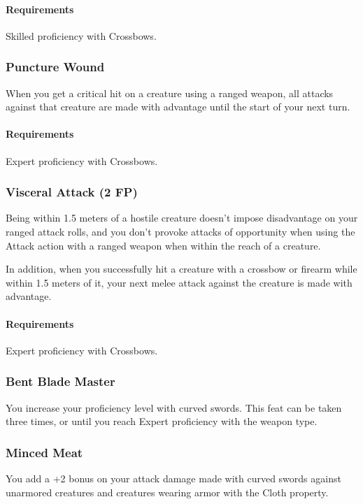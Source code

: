     \paragraph{Requirements} Skilled proficiency with Crossbows.
\subsubsection{Puncture Wound} \label{feat::puncturewound}
    When you get a critical hit on a creature using a ranged weapon, all attacks against that creature are made with advantage until the start of your next turn.
    \paragraph{Requirements} Expert proficiency with Crossbows.
\subsubsection{Visceral Attack (2 FP)} \label{feat::visceralattack}
    Being within 1.5 meters of a hostile creature doesn't impose disadvantage on your ranged attack rolls, and you don't provoke attacks of opportunity when using the Attack action with a ranged weapon when within the reach of a creature.

    In addition, when you successfully hit a creature with a crossbow or firearm while within 1.5 meters of it, your next melee attack against the creature is made with advantage.
    \paragraph{Requirements} Expert proficiency with Crossbows.
\subsubsection{Bent Blade Master} \label{feat::bentblademaster}
    You increase your proficiency level with curved swords.
    This feat can be taken three times, or until you reach Expert proficiency with the weapon type.
\subsubsection{Minced Meat} \label{feat::mincedmeat}
    You add a +2 bonus on your attack damage made with curved swords against unarmored creatures and creatures wearing armor with the Cloth property.
